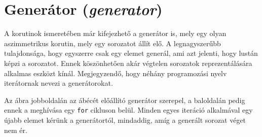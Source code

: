 \documentclass[12pt, a4paper]{article}
\begin{document}
\section{Generátor (\textit{generator})}

A korutinok ismeretében már kifejezhető a generátor is, mely egy olyan aszimmetrikus korutin, mely egy sorozatot állít elő. A legnagyszerűbb tulajdonsága, hogy egyszerre csak egy elemet generál, ami azt jelenti, hogy lustán képzi a sorozatot. Ennek köszönhetően akár végtelen sorozatok reprezentálására alkalmas eszközt kínál. Megjegyzendő, hogy néhány programozási nyelv iterátornak nevezi a generátorokat.

Az ábra jobboldalán az ábécét előállító generátor szerepel, a baloldalán pedig ennek a meghívása egy \texttt{for} cikluson belül. Minden egyes iteráció alkalmával egy újabb elemet kérünk a generátortól, mindaddig, amíg a generált sorozat véget nem ér.
\end{document}
